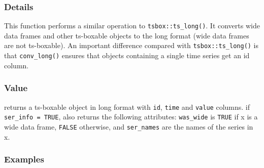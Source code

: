 \documentclass[
  letterpaper,
  DIV=11,
  numbers=noendperiod]{scrreport}
\begin{document}
\subsubsection{Details}\label{details-15}

This function performs a similar operation to
\texttt{tsbox::ts\_long()}. It converts wide data frames and other
ts-boxable objects to the long format (wide data frames are not
ts-boxable). An important difference compared with
\texttt{tsbox::ts\_long()} is that \texttt{conv\_long()} ensures that
objects containing a single time series get an id column.

\subsubsection{Value}\label{value-52}

returns a ts-boxable object in long format with \texttt{id},
\texttt{time} and \texttt{value} columns. if
\texttt{ser\_info\ =\ TRUE}, also returns the following attributes:
\texttt{was\_wide} is \texttt{TRUE} if x is a wide data frame,
\texttt{FALSE} otherwise, and \texttt{ser\_names} are the names of the
series in x.

\subsubsection{Examples}\label{examples-52}
\end{document}
